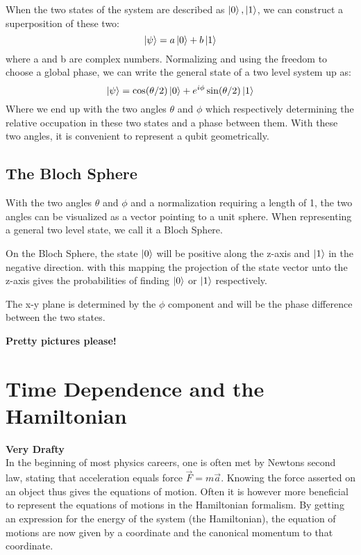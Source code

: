 When the two states of the system are described as $\ket{0}, \ket{1}$, we can construct a superposition of these two:
\begin{equation}
    \ket{\psi} = a \ket{0} + b \ket{1}
\end{equation}
where a and b are complex numbers. Normalizing and using the freedom to choose a global phase, we can write the general state of a two level system up as:
\begin{equation}\label{eq:general_2_state}
    \ket{\psi} = \cos (\theta / 2) \ket{0} + e^{i\phi}\sin(\theta / 2)\ket{1}
\end{equation}
Where we end up with the two angles $\theta$ and $\phi$ which respectively determining the relative occupation in these two states and a phase between them. With these two angles, it is convenient to represent a qubit geometrically.

\subsection{The Bloch Sphere}
With the two angles $\theta$ and $\phi$ and a normalization requiring a length of 1, the two angles can be visualized as a vector pointing to a unit sphere. When representing a general two level state, we call it a Bloch Sphere.

On the Bloch Sphere, the state $\ket{0}$ will be positive along the z-axis and $\ket{1}$ in the negative direction. with this mapping the projection of the state vector unto the z-axis gives the probabilities of finding $\ket{0}$ or $\ket{1}$ respectively.

The x-y plane is determined by the $\phi$ component and will be the phase difference between the two states. 

\textbf{Pretty pictures please!}


\section{Time Dependence and the Hamiltonian}
\textbf{Very Drafty} \\ \noindent
In the beginning of most physics careers, one is often met by Newtons second law, stating that acceleration equals force $\Vec{F} = m \Vec{a}$. Knowing the force asserted on an object thus gives the equations of motion. Often it is however more beneficial to represent the equations of motions in the Hamiltonian formalism. By getting an expression for the energy of the system (the Hamiltonian), the equation of motions are now given by a coordinate and the canonical momentum to that coordinate. 

